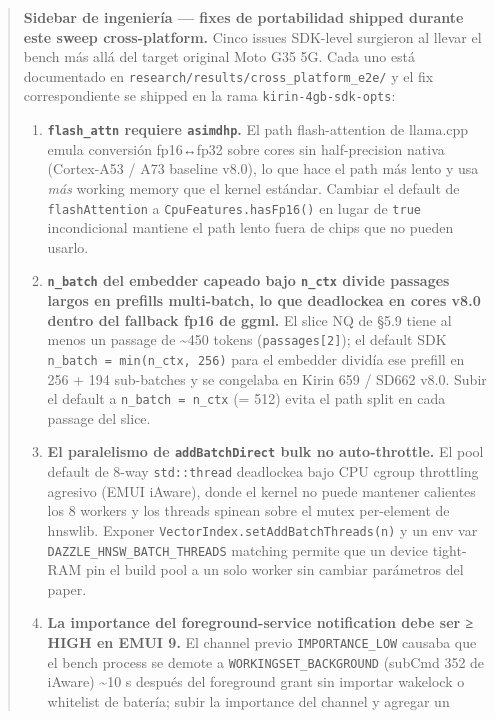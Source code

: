 \begin{quote}
\textbf{Sidebar de ingeniería --- fixes de portabilidad shipped durante este
sweep cross-platform.} Cinco issues SDK-level surgieron al llevar el bench más
allá del target original Moto G35 5G. Cada uno está documentado en
\texttt{research/results/cross\_platform\_e2e/} y el fix correspondiente se
shipped en la rama \texttt{kirin-4gb-sdk-opts}:

\begin{enumerate}
\def\labelenumi{\arabic{enumi}.}
\tightlist
\item
  \textbf{\texttt{flash\_attn} requiere \texttt{asimdhp}.} El path
  flash-attention de llama.cpp emula conversión fp16↔fp32 sobre cores sin
  half-precision nativa (Cortex-A53 / A73 baseline v8.0), lo que hace el path
  más lento y usa \emph{más} working memory que el kernel estándar. Cambiar el
  default de \texttt{flashAttention} a \texttt{CpuFeatures.hasFp16()} en lugar
  de \texttt{true} incondicional mantiene el path lento fuera de chips que no
  pueden usarlo.
\item
  \textbf{\texttt{n\_batch} del embedder capeado bajo \texttt{n\_ctx} divide
  passages largos en prefills multi-batch, lo que deadlockea en cores v8.0
  dentro del fallback fp16 de ggml.} El slice NQ de §5.9 tiene al menos un
  passage de \textasciitilde450 tokens (\texttt{passages{[}2{]}}); el default
  SDK \texttt{n\_batch\ =\ min(n\_ctx,\ 256)} para el embedder dividía ese
  prefill en 256 + 194 sub-batches y se congelaba en Kirin 659 / SD662 v8.0.
  Subir el default a \texttt{n\_batch\ =\ n\_ctx} (= 512) evita el path split en
  cada passage del slice.
\item
  \textbf{El paralelismo de \texttt{addBatchDirect} bulk no auto-throttle.} El
  pool default de 8-way \texttt{std::thread} deadlockea bajo CPU cgroup
  throttling agresivo (EMUI iAware), donde el kernel no puede mantener calientes
  los 8 workers y los threads spinean sobre el mutex per-element de hnswlib.
  Exponer \texttt{VectorIndex.setAddBatchThreads(n)} y un env var
  \texttt{DAZZLE\_HNSW\_BATCH\_THREADS} matching permite que un device tight-RAM
  pin el build pool a un solo worker sin cambiar parámetros del paper.
\item
  \textbf{La importance del foreground-service notification debe ser ≥ HIGH en
  EMUI 9.} El channel previo \texttt{IMPORTANCE\_LOW} causaba que el bench
  process se demote a \texttt{WORKINGSET\_BACKGROUND} (subCmd 352 de iAware)
  \textasciitilde10 s después del foreground grant sin importar wakelock o
  whitelist de batería; subir la importance del channel y agregar un

\end{enumerate}
\end{quote}
